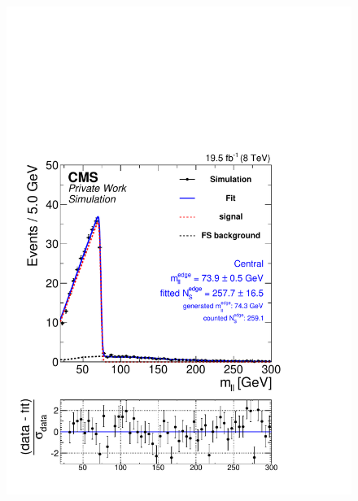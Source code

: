 \begin{figure}[hbp]
  \centering
  \begin{minipage}[t]{0.49\textwidth}
    \includegraphics[width=\textwidth]{plots/results/fit/mcFits/shapeIllustrationKTriangle_SignalInclusive_Combined_Full2012_KTriangle_MC_slepton_500_175_100_Central.pdf}
  \end{minipage}
  \begin{minipage}[t]{0.49\textwidth}

\end{minipage}
\end{figure}
